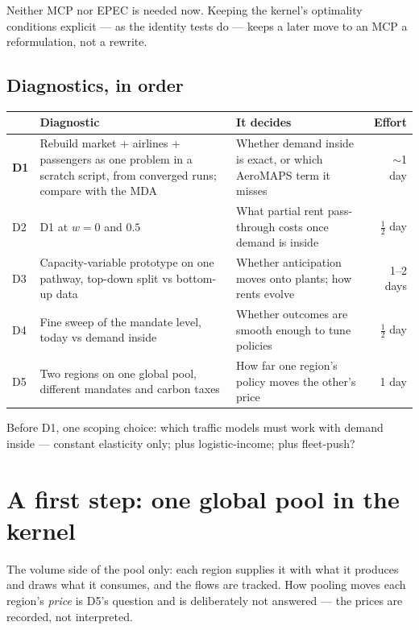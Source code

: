 \documentclass[11pt,a4paper]{article}
\begin{document}
\noindent Neither MCP nor EPEC is needed now. Keeping the kernel's optimality conditions explicit
--- as the identity tests do --- keeps a later move to an MCP a reformulation, not a rewrite.

\subsection{Diagnostics, in order}
\label{sec:diagnostics}

\begin{table}[h]
\centering\small
\begin{tabular}{@{}lp{6.4cm}p{6.0cm}r@{}}
\toprule
& \textbf{Diagnostic} & \textbf{It decides} & \textbf{Effort} \\
\midrule
\textbf{D1} & Rebuild market + airlines + passengers as one problem in a scratch script, from converged runs; compare with the MDA & Whether demand inside is exact, or which AeroMAPS term it misses & $\sim$1 day \\
D2 & D1 at $w=0$ and $0.5$ & What partial rent pass-through costs once demand is inside & $\tfrac12$ day \\
D3 & Capacity-variable prototype on one pathway, top-down split vs bottom-up data & Whether anticipation moves onto plants; how rents evolve & 1--2 days \\
D4 & Fine sweep of the mandate level, today vs demand inside & Whether outcomes are smooth enough to tune policies & $\tfrac12$ day \\
D5 & Two regions on one global pool, different mandates and carbon taxes & How far one region's policy moves the other's price & 1 day \\
\bottomrule
\end{tabular}
\end{table}

\noindent Before D1, one scoping choice: which traffic models must work with demand inside
--- constant elasticity only; plus logistic-income; plus fleet-push?

\section{A first step: one global pool in the kernel}
\label{sec:pool}

The volume side of the pool only: each region supplies it with what it produces and draws what
it consumes, and the flows are tracked. How pooling moves each region's \emph{price} is D5's
question and is deliberately not answered --- the prices are recorded, not interpreted.
\end{document}

